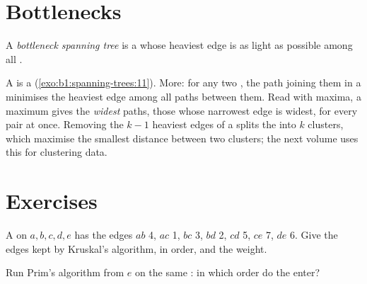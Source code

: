 \section{Bottlenecks}\label{sec:b1:spanning-trees:bottleneck}

\begin{definition}\label{def:b1:spanning-trees:bottleneck}
A \emph{bottleneck spanning tree} is a  whose heaviest edge is as light as
possible among all .
\end{definition}

A  is a  (\cref{exo:b1:spanning-trees:11}). More: for any two ,
the path joining them in a  minimises the heaviest edge among all paths between them. Read with
maxima, a maximum  gives the \emph{widest} paths, those whose narrowest edge is widest, for every pair at
once. Removing the $k - 1$ heaviest edges of a  splits the  into $k$ clusters, which
maximise the smallest distance between two clusters; the next volume uses this for clustering data.

\section{Exercises}\label{sec:b1:spanning-trees:exercises}

\begin{exercise}[$\star$]\label{exo:b1:spanning-trees:1}
A  on $a, b, c, d, e$ has the edges $ab$ 4, $ac$ 1, $bc$ 3, $bd$ 2, $cd$ 5, $ce$ 7, $de$ 6. Give the edges kept by
Kruskal's algorithm, in order, and the weight.
\end{exercise}

\begin{exercise}[$\star$]\label{exo:b1:spanning-trees:2}
Run Prim's algorithm from $e$ on the same : in which order do the  enter?
\end{exercise}

